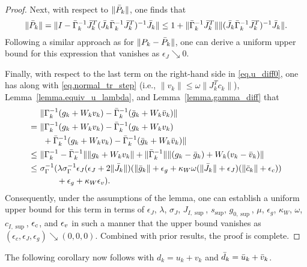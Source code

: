 \begin{proof}
  Next, with respect to $\|{\bar P}_k\|$, one finds that
  \begin{equation*}
    \|{\bar P}_k\| = \|I - {\bar \Gamma}_k^{-1} {\bar J}_k^T ({\bar J}_k {\bar \Gamma}_k^{-1}{\bar J}_k^T)^{-1} {\bar J}_k\| \leq 1 + \| {\bar \Gamma}_k^{-1} {\bar J}_k^T  \| \|({\bar J}_k {\bar \Gamma}_k^{-1}{\bar J}_k^T)^{-1} {\bar J}_k\|.
  \end{equation*}
  Following a similar approach as for $\|P_k - {\bar P}_k\|$, one can derive a uniform upper bound for this expression that vanishes as $\epsilon_J \searrow 0$.
  
  Finally, with respect to the last term on the right-hand side in \eqref{eq.u_diff0}, one has along with \eqref{eq.normal_tr_step} (i.e., $\|v_k\| \leq \omega \|J_k^T c_k\|$), Lemma~\ref{lemma.equiv_u_lambda}, and Lemma~\ref{lemma.gamma_diff} that
  \begin{align*}
     &\ \|\Gamma_k^{-1}(g_k + W_k v_k) - {\bar \Gamma}_k^{-1} ({\bar g}_k +  W_k {\bar v}_k) \|\\
    =&\ \|\Gamma_k^{-1}(g_k + W_k v_k) - {\bar \Gamma}_k^{-1} (g_k + W_k v_k) \\
    &\ \ + {\bar \Gamma}_k^{-1}(g_k + W_k v_k) - {\bar \Gamma}_k^{-1} ({\bar g}_k +  W_k {\bar v}_k) \| \\
    \leq&\ \|\Gamma_k^{-1}  - {\bar \Gamma}_k^{-1} \| \|g_k+   W_k v_k\| + \|{\bar \Gamma}_k^{-1} \| \|(g_k - {\bar g}_k) +   W_k (v_k - {\bar v}_k)\| \\
    \leq&\ \sigma_{\Gamma}^{-1} ( \lambda \sigma_{\Gamma}^{-1} \epsilon_J (\epsilon_J + 2 \|{\bar J}_k\|)  ( \|{\bar g}_k\| + \epsilon_g + \kappa_W \omega (\|{\bar J}_k\| + \epsilon_J) (\|{\bar c}_k\| + \epsilon_c) ) \\
    &\ \ \ \ \ \ \ + \epsilon_g + \kappa_W \epsilon_v).
  \end{align*}
  Consequently, under the assumptions of the lemma, one can establish a uniform upper bound for this term in terms of $\epsilon_J$, $\lambda$, $\sigma_J$, $J_{I,\sup}$, $s_{\sup}$, $g_{0,\sup}$, $\mu$, $\epsilon_g$, $\kappa_W$, $\omega$, $c_{I,\sup}$, $\epsilon_c$, and $\epsilon_v$ in such a manner that the upper bound vanishes as $(\epsilon_c,\epsilon_J,\epsilon_g) \searrow (0,0,0)$.  Combined with prior results, the proof is complete.
\end{proof}

The following corollary now follows with $d_k = u_k + v_k$ and ${\bar d}_k = {\bar u}_k + {\bar v}_k$.

